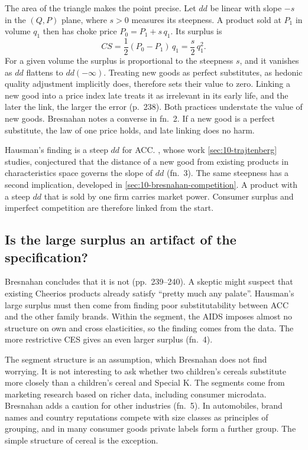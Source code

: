 The area of the triangle makes the point precise. Let $dd$ be linear with slope $-s$ in the $(Q, P)$ plane,
where $s > 0$ measures its steepness. A product sold at $P_1$ in volume $q_1$ then has choke price
$P_0 = P_1 + s\,q_1$. Its surplus is
\begin{equation}\label{eq:10-b-triangle}
  CS = \frac{1}{2}(P_0 - P_1)\,q_1 = \frac{s}{2}\,q_1^2.
\end{equation}
For a given volume the surplus is proportional to the steepness $s$, and it vanishes as $dd$ flattens to
$dd(-\infty)$. Treating new goods as perfect substitutes, as hedonic quality adjustment implicitly does,
therefore sets their value to zero. Linking a new good into a price index late treats it as irrelevant in
its early life, and the later the link, the larger the error (p.~238). Both practices understate the value
of new goods. Bresnahan notes a converse in fn.~2. If a new good is a perfect substitute, the law of one price
holds, and late linking does no harm.

Hausman's finding is a steep $dd$ for ACC. \citet{Trajtenberg1989}, whose work \cref{sec:10-trajtenberg}
studies, conjectured that the distance of a new good from existing products in characteristics space governs
the slope of $dd$ (fn.~3). The same steepness has a second implication, developed in
\cref{sec:10-bresnahan-competition}. A product with a steep $dd$ that is sold by one firm carries market
power. Consumer surplus and imperfect competition are therefore linked from the start.

\subsection{Is the large surplus an artifact of the specification?}\label{sec:10-bresnahan-spec}

Bresnahan concludes that it is not (pp.~239--240). A skeptic might suspect that existing Cheerios products
already satisfy ``pretty much any palate''. Hausman's large surplus must then come from finding poor
substitutability between ACC and the other family brands. Within the segment, the AIDS imposes almost no
structure on own and cross elasticities, so the finding comes from the data. The more restrictive CES gives
an even larger surplus (fn.~4).

The segment structure is an assumption, which Bresnahan does not find worrying. It is not interesting to
ask whether two children's cereals substitute more closely than a children's cereal and Special K. The
segments come from marketing research based on richer data, including consumer microdata. Bresnahan adds a
caution for other industries (fn.~5). In automobiles, brand names and country reputations compete with size
classes as principles of grouping, and in many consumer goods private labels form a further group. The
simple structure of cereal is the exception.

